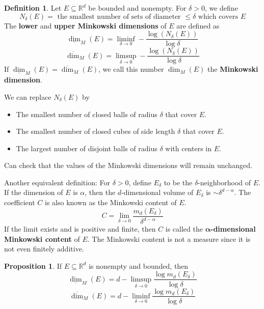 \documentclass{article}
\theoremstyle{definition}
\newtheorem{dfn}{Definition}
\newtheorem{prop}{Proposition}
\newcommand{\RR}{\mathbb R}
\begin{document}
\begin{dfn}
	Let $E \subseteq \RR^d$ be bounded and nonempty.
	For $\delta > 0$, we define 
	\[
		N_\delta(E) = \text{ the smallest number of sets of diameter } \leq \delta \text{ which covers } E
	\]
	The \textbf{lower} and \textbf{upper Minkowski dimensions} of $E$ are defined as
	\[
		\underline{\dim}_M(E) = \liminf_{\delta \to 0} - \frac{\log (N_\delta(E))}{\log \delta}
	\]
	\[
		\overline{\dim}_M(E) = \limsup_{\delta \to 0} -\frac{\log (N_\delta(E))}{\log \delta}
	\]
	If $\underline{\dim}_M(E) = \overline{\dim}_M(E)$, we call this number $\dim_M(E)$ the \textbf{Minkowski dimension}.
\end{dfn}

We can replace $N_\delta(E)$ by 
\begin{itemize}
	\item The smallest number of closed balls of radius $\delta$ that cover $E$.

	\item The smallest number of closed cubes of side length $\delta$ that cover $E$.

	\item The largest number of disjoint balls of radius $\delta$ with centers in $E$.
\end{itemize}

Can check that the values of the Minkowski dimensions will remain unchanged.

\par Another equivalent definition:
For $\delta > 0$, define $E_\delta$ to be the $\delta$-neighborhood of $E$.
If the dimension of $E$ is $\alpha$, then the $d$-dimensional volume of $E_\delta$ is $\sim \delta^{d - \alpha}$.
The coefficient $C$ is also known as the Minkowski content of $E$.
\[
	C = \lim_{\delta \to 0} \frac{m_d(E_\delta)}{\delta^{d - \alpha}}
\]
If the limit exists and is positive and finite, then $C$ is called the \textbf{$\bm{\alpha}$-dimensional Minkowski content} of $E$.
The Minkowski content is not a measure since it is not even finitely additive.

\begin{prop}
	If $E \subseteq \RR^d$ is nonempty and bounded, then
	\[
		\underline{\dim}_M(E) = d - \limsup_{\delta \to 0} \frac{\log m_d(E_\delta)}{\log \delta}
	\]
	\[
		\overline{\dim}_M(E) = d - \liminf_{\delta \to 0} \frac{\log m_d(E_\delta)}{\log \delta}
	\]
\end{prop}
\end{document}
